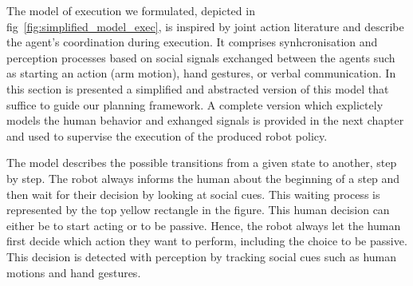 
The model of execution we formulated, depicted in fig~\ref{fig:simplified_model_exec}, is inspired by joint action literature and describe the agent's coordination during execution. It comprises synhcronisation and perception processes based on social signals exchanged between the agents such as starting an action (arm motion), hand gestures, or verbal communication. In this section is presented a simplified and abstracted version of this model that suffice to guide our planning framework. A complete version which explictely models the human behavior and exhanged signals is provided in the next chapter and used to supervise the execution of the produced robot policy.  



The model describes the possible transitions from a given state to another, step by step. The robot always informs the human about the beginning of a step and then wait for their decision by looking at social cues. This waiting process is represented by the top yellow rectangle in the figure. This human decision can either be to start acting or to be passive. Hence, the robot always let the human first decide which action they want to perform, including the choice to be passive. This decision is detected with perception by tracking social cues such as human motions and hand gestures.


